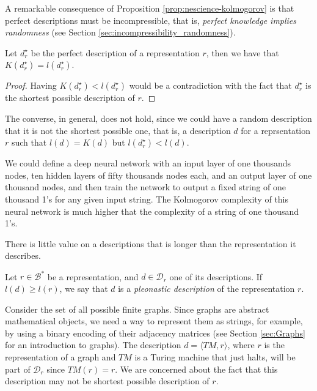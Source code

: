 A remarkable consequence of Proposition \ref{prop:nescience-kolmogorov} is that perfect descriptions must be incompressible, that is, \emph{perfect knowledge implies randomness} (see Section \ref{sec:incompressibility_randomness}).

\begin{corollary}
Let $d_r^{\star}$ be the perfect description of a representation $r$, then we have that $K \left( d_r^{\star} \right) = l \left( d_r^{\star} \right)$.
\end{corollary}
\begin{proof}
Having $K \left( d_r^{\star} \right) < l \left( d_r^{\star} \right)$ would be a contradiction with the fact that $d_r^{\star}$ is the shortest possible description of $r$.
\end{proof}

The converse, in general, does not hold, since we could have a random description that it is not the shortest possible one, that is, a description $d$ for a reprsentation $r$ such that $l(d) = K(d)$ but $l(d_r^{\star}) < l(d)$.

\begin{example}
\label{ex:description_neural}
We could define a deep neural network with an input layer of one thousands nodes, ten hidden layers of fifty thousands nodes each, and an output layer of one thousand nodes, and then train the network to output a fixed string of one thousand 1's for any given input string. The Kolmogorov complexity of this neural network is much higher that the complexity of a string of one thousand 1's.
\end{example}

There is little value on a descriptions that is longer than the representation it describes.

\begin{definition}
\label{def:trivial_model}
Let $r \in \mathcal{B}^\ast$ be a representation, and $d \in \mathcal{D}_r$ one of its descriptions. If $l(d) \geq l(r)$, we say that $d$ is a \emph{pleonastic description} of the representation $r$.
\end{definition}

\begin{example}
\label{ex:topics_models_graph}
Consider the set of all possible finite graphs. Since graphs are abstract mathematical objects, we need a way to represent them as strings, for example, by using a binary encoding of their adjacency matrices (see Section \ref{sec:Graphs} for an introduction to graphs). The description $d = \langle TM, r \rangle$, where $r$ is the representation of a graph and $TM$ is a Turing machine that just halts, will be part of $\mathcal{D}_r$ since $TM(r) = r$. We are concerned about the fact that this description may not be shortest possible description of $r$.
\end{example}

